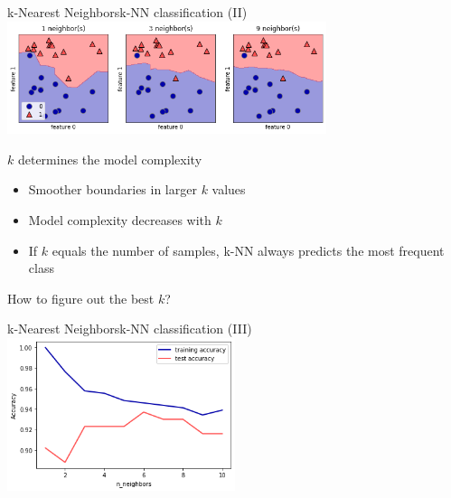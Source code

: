 \documentclass[10pt,compress]{beamer} %
\begin{document}
\begin{frame}{k-Nearest Neighbors}{k-NN classification (II)}
    \centering 
	\includegraphics[width=0.7\textwidth]{figs/knnboundary.png}

    \flushleft

    $k$ determines the model complexity
    \begin{itemize}
        \item Smoother boundaries in larger $k$ values
        \item Model complexity decreases with $k$
        \item If $k$ equals the number of samples, k-NN always predicts the most frequent class
    \end{itemize}
    How to figure out the best $k$?
\end{frame}

\begin{frame}{k-Nearest Neighbors}{k-NN classification (III)}
    \centering 
	\includegraphics[width=0.5\textwidth]{figs/k-complexity.png}
\end{frame}
\end{document}
